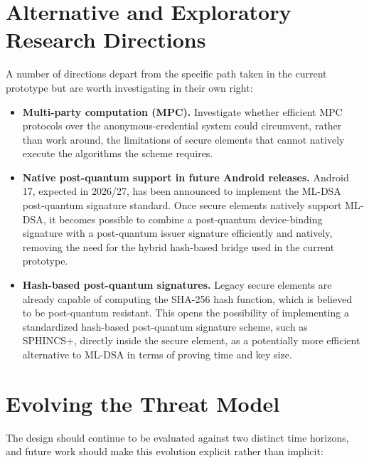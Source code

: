 \documentclass[binding=0.6cm,oneside,noexaminfo]{sapthesis}
\begin{document}
\section{Alternative and Exploratory Research Directions}

A number of directions depart from the specific path taken in the current prototype but are worth investigating in their own right:

\begin{itemize}
    \item \textbf{Multi-party computation (MPC).} Investigate whether efficient MPC protocols over the anonymous-credential system could circumvent, rather than work around, the limitations of secure elements that cannot natively execute the algorithms the scheme requires.
    \item \textbf{Native post-quantum support in future Android releases.} Android 17, expected in 2026/27, has been announced to implement the ML-DSA post-quantum signature standard. Once secure elements natively support ML-DSA, it becomes possible to combine a post-quantum device-binding signature with a post-quantum issuer signature efficiently and natively, removing the need for the hybrid hash-based bridge used in the current prototype.
    \item \textbf{Hash-based post-quantum signatures.} Legacy secure elements are already capable of computing the SHA-256 hash function, which is believed to be post-quantum resistant. This opens the possibility of implementing a standardized hash-based post-quantum signature scheme, such as SPHINCS+, directly inside the secure element, as a potentially more efficient alternative to ML-DSA in terms of proving time and key size.
\end{itemize}

\section{Evolving the Threat Model}

The design should continue to be evaluated against two distinct time horizons, and future work should make this evolution explicit rather than implicit:
\end{document}
